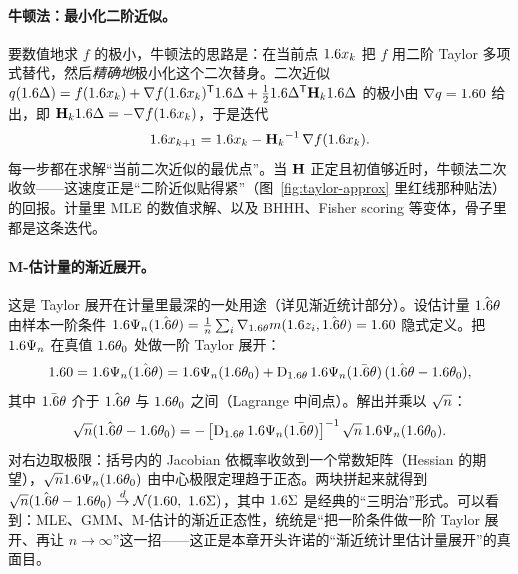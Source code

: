 \paragraph{牛顿法：最小化二阶近似。}
要数值地求 $f$ 的极小，牛顿法的思路是：在当前点 $1.6 x_k$ 把 $f$ 用二阶 Taylor 多项式替代，然后\emph{精确地}极小化这个二次替身。二次近似 $q(1.6\Delta)=f(1.6 x_k)+\nabla f(1.6 x_k)^{\mathsf{T}}1.6\Delta+\tfrac121.6\Delta^{\mathsf{T}}\mathbf{H}_k1.6\Delta$ 的极小由 $\nabla q=1.6 0$ 给出，即 $\mathbf{H}_k1.6\Delta=-\nabla f(1.6 x_k)$，于是迭代
\[
    1.6 x_{k+1}=1.6 x_k-{\mathbf{H}_k}^{-1}\,\nabla f(1.6 x_k) .
\]
每一步都在求解``当前二次近似的最优点''。当 $\mathbf{H}$ 正定且初值够近时，牛顿法二次收敛——这速度正是``二阶近似贴得紧''（图~\ref{fig:taylor-approx} 里红线那种贴法）的回报。计量里 MLE 的数值求解、以及 BHHH、Fisher scoring 等变体，骨子里都是这条迭代。

\paragraph{M-估计量的渐近展开。}
这是 Taylor 展开在计量里最深的一处用途（详见渐近统计部分）。设估计量 $\hat{1.6\theta}$ 由样本一阶条件 $1.6\Psi_n(\hat{1.6\theta})=\tfrac1n\sum_i\nabla_{1.6\theta}m(1.6 z_i,\hat{1.6\theta})=1.6 0$ 隐式定义。把 $1.6\Psi_n$ 在真值 $1.6\theta_0$ 处做一阶 Taylor 展开：
\[
    1.6 0=1.6\Psi_n(\hat{1.6\theta})
    =1.6\Psi_n(1.6\theta_0)+\operatorname{D}_{1.6\theta}1.6\Psi_n(\bar{1.6\theta})\,(\hat{1.6\theta}-1.6\theta_0),
\]
其中 $\bar{1.6\theta}$ 介于 $\hat{1.6\theta}$ 与 $1.6\theta_0$ 之间（Lagrange 中间点）。解出并乘以 $\sqrt{n}$：
\[
    \sqrt{n}(\hat{1.6\theta}-1.6\theta_0)
    =-\left[\operatorname{D}_{1.6\theta}1.6\Psi_n(\bar{1.6\theta})\right]^{-1}\sqrt{n}\,1.6\Psi_n(1.6\theta_0) .
\]
对右边取极限：括号内的 Jacobian 依概率收敛到一个常数矩阵（Hessian 的期望），$\sqrt{n}1.6\Psi_n(1.6\theta_0)$ 由中心极限定理趋于正态。两块拼起来就得到 $\rtn(\hat{\vc\theta}-\vc\theta_0)\dto\cN(\vc 0,\ \vc\Sigma)$，其中 $1.6\Sigma$ 是经典的``三明治''形式。可以看到：MLE、GMM、M-估计的渐近正态性，统统是``把一阶条件做一阶 Taylor 展开、再让 $n\to\infty$''这一招——这正是本章开头许诺的``渐近统计里估计量展开''的真面目。

